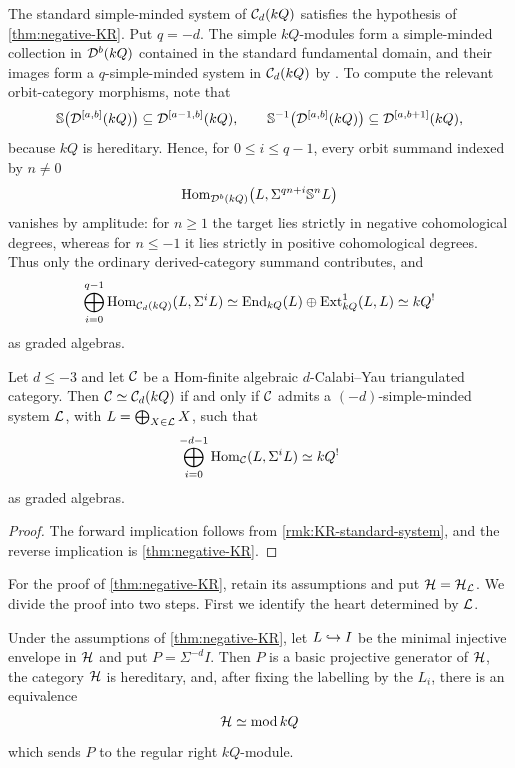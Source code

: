 \documentclass[11pt,a4paper,dvipsnames,x11names]{amsart}
\begin{document}
\begin{rmk}\label{rmk:KR-standard-system}
The standard simple-minded system of $\mathcal C_d(kQ)$ satisfies the hypothesis of \cref{thm:negative-KR}. Put $q=-d$. The simple $kQ$-modules form a simple-minded collection in $\mathcal D^b(kQ)$ contained in the standard fundamental domain, and their images form a $q$-simple-minded system in $\mathcal C_d(kQ)$ by \cite[Theorem~4.1]{CoelhoPauksztelloPloog22}. To compute the relevant orbit-category morphisms, note that
\[
\mathbb S\bigl(\mathcal D^{[a,b]}(kQ)\bigr)\subseteq\mathcal D^{[a-1,b]}(kQ),
\qquad
\mathbb S^{-1}\bigl(\mathcal D^{[a,b]}(kQ)\bigr)\subseteq\mathcal D^{[a,b+1]}(kQ),
\]
because $kQ$ is hereditary. Hence, for $0\leq i\leq q-1$, every orbit summand indexed by $n\neq0$
\[
\operatorname{Hom}_{\mathcal D^b(kQ)}\bigl(L,\Sigma^{qn+i}\mathbb S^nL\bigr)
\]
vanishes by amplitude: for $n\geq1$ the target lies strictly in negative cohomological degrees, whereas for $n\leq-1$ it lies strictly in positive cohomological degrees. Thus only the ordinary derived-category summand contributes, and
\[
\bigoplus_{i=0}^{q-1}\operatorname{Hom}_{\mathcal C_d(kQ)}(L,\Sigma^iL)
\simeq\operatorname{End}_{kQ}(L)\oplus\operatorname{Ext}^1_{kQ}(L,L)\simeq kQ^!
\]
as graded algebras.
\end{rmk}

\begin{cor}\label{cor:negative-KR-characterization}
Let $d\leq-3$ and let $\mathcal C$ be a Hom-finite algebraic $d$-Calabi--Yau triangulated category. Then $\mathcal C\simeq\mathcal C_d(kQ)$ if and only if $\mathcal C$ admits a $(-d)$-simple-minded system $\mathcal L$, with $L=\bigoplus_{X\in\mathcal L}X$, such that
\[
\bigoplus_{i=0}^{-d-1}\operatorname{Hom}_{\mathcal C}(L,\Sigma^iL)\simeq kQ^!
\]
as graded algebras.
\end{cor}
\begin{proof}
The forward implication follows from \cref{rmk:KR-standard-system}, and the reverse implication is \cref{thm:negative-KR}.
\end{proof}

For the proof of \cref{thm:negative-KR}, retain its assumptions and put $\mathcal H=\mathcal H_{\mathcal L}$. We divide the proof into two steps. First we identify the heart determined by $\mathcal L$.

\begin{lem}\label{lem:KR-heart}
    Under the assumptions of \cref{thm:negative-KR}, let $L\hookrightarrow I$ be the minimal injective envelope in $\mathcal H$ and put $P=\Sigma^{-d}I$. Then $P$ is a basic projective generator of $\mathcal H$, the category $\mathcal H$ is hereditary, and, after fixing the labelling by the $L_i$, there is an equivalence
    \[
        \mathcal H\simeq\operatorname{mod} kQ
    \]
    which sends $P$ to the regular right $kQ$-module.
\end{lem}
\end{document}
